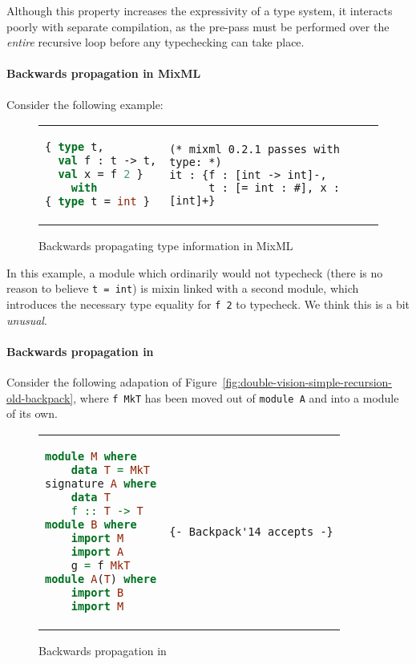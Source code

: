 Although this property increases the expressivity of a type
system, it interacts poorly with separate compilation, as the
pre-pass must be performed over the \emph{entire} recursive loop
before any typechecking can take place.

\paragraph{Backwards propagation in MixML}  Consider the following
example:

\begin{figure}[H]
\begin{tabular}{p{} p{}}
\begin{lstlisting}[language=ML,escapechar=@]
{ type t,
  val f : t -> t,
  val x = f 2 }
    with
{ type t = int }
\end{lstlisting}
&
\begin{verbatim}
(* mixml 0.2.1 passes with type: *)
it : {f : [int -> int]-,
      t : [= int : #], x : [int]+}
\end{verbatim}
\end{tabular}
\caption{Backwards propagating type information in MixML}
\label{fig:double-vision-backwards-propagating-mixml}
\end{figure}

\noindent
In this example, a module which ordinarily would not typecheck
(there is no reason to believe \verb|t = int|) is mixin linked
with a second module, which introduces the necessary type equality
for \verb|f 2| to typecheck.  We think this is a bit \emph{unusual}.


\paragraph{Backwards propagation in \OldBackpack{}}

Consider the following adapation of
Figure~\ref{fig:double-vision-simple-recursion-old-backpack}, where
\verb|f MkT| has been moved out of \verb|module A| and into a module of
its own.

\begin{figure}[H]
\begin{tabular}{p{} p{}}
\begin{lstlisting}[language=Haskell,escapechar=@]
module M where
    data T = MkT
signature A where
    data T
    f :: T -> T
module B where
    import M
    import A
    g = f MkT
module A(T) where
    import B
    import M
\end{lstlisting}
&
\begin{verbatim}
{- Backpack'14 accepts -}
\end{verbatim}
\end{tabular}
\caption{Backwards propagation in \OldBackpack{}}
\label{fig:double-vision-backwards-propagating-old-backpack}
\end{figure}

